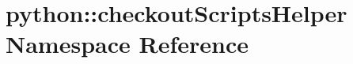 \hypertarget{namespacepython_1_1checkoutScriptsHelper}{
\section{python::checkoutScriptsHelper Namespace Reference}
\label{namespacepython_1_1checkoutScriptsHelper}
}
